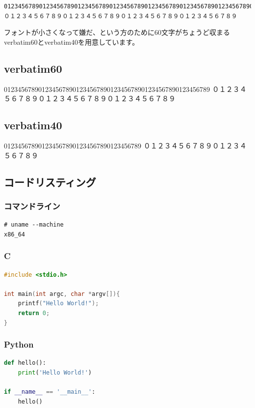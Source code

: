\begin{verbatim}
01234567890123456789012345678901234567890123456789012345678901234567890123456789
０１２３４５６７８９０１２３４５６７８９０１２３４５６７８９０１２３４５６７８９
\end{verbatim}

フォントが小さくなって嫌だ、という方のために60文字がちょうど収まるverbatim60とverbatim40を用意しています。

\subsection{verbatim60}

\begin{verbatim60}
012345678901234567890123456789012345678901234567890123456789
０１２３４５６７８９０１２３４５６７８９０１２３４５６７８９
\end{verbatim60}

\subsection{verbatim40}

\begin{verbatim40}
0123456789012345678901234567890123456789
０１２３４５６７８９０１２３４５６７８９
\end{verbatim40}

\subsection{コードリスティング}

\subsubsection{コマンドライン}
\begin{lstlisting}[language=command]
# uname --machine
x86_64
\end{lstlisting}

\subsubsection{C}
\begin{lstlisting}[language=C]
#include <stdio.h>

int main(int argc, char *argv[]){
    printf("Hello World!");
    return 0;
}
\end{lstlisting}

\subsubsection{Python}
\begin{lstlisting}[language=python]
def hello():
    print('Hello World!')

if __name__ == '__main__':
    hello()
\end{lstlisting}

